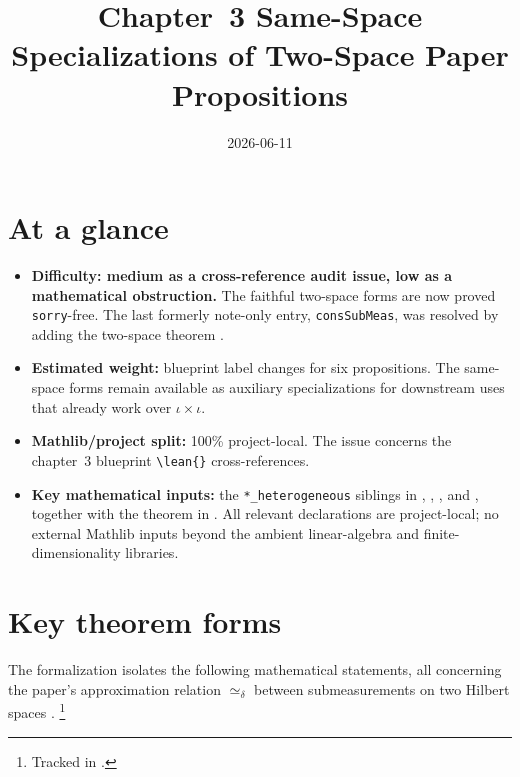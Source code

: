 \documentclass[11pt]{article}
\title{Chapter~3 Same-Space Specializations of Two-Space Paper Propositions}
\author{}
\date{2026-06-11}
\begin{document}
\maketitle

\section{At a glance}

\begin{itemize}
  \item \textbf{Difficulty: medium as a cross-reference audit issue, low as a
  mathematical obstruction.}  The faithful two-space forms are now proved
  \verb|sorry|-free.  The last formerly note-only entry,
  \verb|consSubMeas|, was resolved by adding the two-space theorem
  .
  \item \textbf{Estimated weight:} blueprint label changes for six
  propositions.  The same-space forms remain available as auxiliary
  specializations for downstream uses that already work over \(\iota\times
  \iota\).
  \item \textbf{Mathlib/project split:} 100\% project-local.  The issue
  concerns the chapter~3 blueprint \verb|\lean{}| cross-references.
  \item \textbf{Key mathematical inputs:} the \verb|*_heterogeneous| siblings
  in
  ,
  ,
  , and
  , together with the
   theorem in
  .  All relevant declarations are
  project-local; no external Mathlib inputs beyond the ambient linear-algebra
  and finite-dimensionality libraries.
\end{itemize}

\section{Key theorem forms}

The formalization isolates the following mathematical statements, all
concerning the paper's approximation relation \(\simeq_\delta\) between
submeasurements on two Hilbert spaces \cite{Ji2020LowIndividualDegree}.%
\footnote{Tracked in .}
\end{document}

